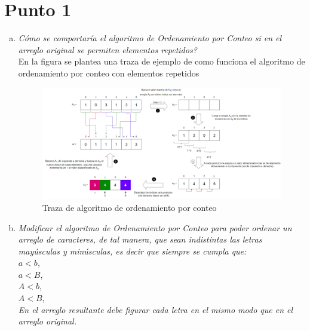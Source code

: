 \section{Punto 1}
\begin{enumerate}[a)]
  \item \textit{Cómo se comportaría el algoritmo de Ordenamiento por Conteo si en el arreglo original se permiten elementos repetidos?}\\

  En la figura  se plantea una traza de ejemplo de como funciona el algoritmo de ordenamiento por conteo con elementos repetidos

  \begin{figure}
    \centering
    \includegraphics[width=\textwidth, scale=1]{Images/Punto1/Traza ordenamiento por conteo.png}
    \caption{Traza de algoritmo de ordenamiento por conteo}
    \label{fig:Traza ordenamiento por conteo}
  \end{figure}




  \item \textit{Modificar el algoritmo de Ordenamiento por Conteo para poder ordenar un arreglo de caracteres,
  de tal manera, que sean indistintas las letras mayúsculas y minúsculas, es decir que siempre se cumpla
  que:}\\
  $a<b$,\\
  $a<B$,\\
  $A<b$,\\
  $A<B$,\\
  \textit{En el arreglo resultante debe figurar cada letra en el mismo modo que en el arreglo original.
  }
\end{enumerate}
